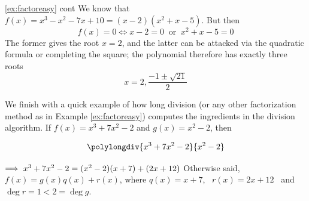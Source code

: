 

\begin{example*}{\ref{ex:factoreasy} cont}{}
	We know that $f(x)=x^3-x^2-7x+10=(x-2)(x^2+x-5)$. But then
	\[
		f(x)=0\iff x-2=0\ \text{ or }\ x^2+x-5=0
	\]
	The former gives the root $x=2$, and the latter can be attacked via the quadratic formula or completing the square; the polynomial therefore has exactly three roots
	\[
		x=2,\frac{-1\pm\sqrt{21}}2
	\] 
\end{example*}


\begin{example}{}{}
	We finish with a quick example of how long division (or any other factorization method as in Example \ref{ex:factoreasy}) computes the ingredients in the division algorithm.\smallbreak
	If $f(x)=x^3+7x^2-2$ and $g(x)=x^2-2$, then\par
	\begin{minipage}[t]{0.35\linewidth}\vspace{-13pt}
		\[
			\polylongdiv{x^3+7x^2-2}{x^2-2}
		\]
	\end{minipage}
	\hfill
	\begin{minipage}[t]{0.6\linewidth}\vspace{10pt}
		$\negthickspace\implies x^3+7x^2-2=(x^2-2)(x+7)+(2x+12)$\medbreak
		Otherwise said, $f(x)=g(x)q(x)+r(x)$, where\medbreak
		$q(x)=x+7$, \ $r(x)=2x+12$ \ and \ $\deg r=1<2=\deg g$.
	\end{minipage}
\end{example}

\goodbreak



